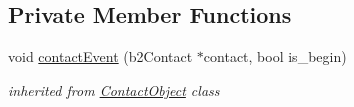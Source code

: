 \subsection*{Private Member Functions}
\begin{DoxyCompactItemize}
\item 
\mbox{\label{class_lever_a08d617d4aad99c811df6013648843d8b}} 
void \hyperlink{class_lever_a08d617d4aad99c811df6013648843d8b}{contact\+Event} (b2\+Contact $\ast$contact, bool is\+\_\+begin)
\begin{DoxyCompactList}\small\item\em inherited from \hyperlink{class_contact_object}{Contact\+Object} class \end{DoxyCompactList}\end{DoxyCompactItemize}
